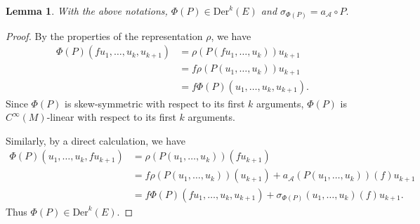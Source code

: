 \documentclass[pdftex]{sigma}%
\numberwithin{equation}{section}
\newtheorem{lem}[thm]{Lemma}
\newcommand{\huaA}{\mathcal{A}}
\newcommand{\CWM}{C^{\infty}(M)}
\newcommand{\Der}{\mathrm{Der}}
\begin{document}
\begin{lem}%
With the above notations, $\Phi(P)\in \Der^{k}(E)$ and $\sigma_{\Phi(P)}=a_\huaA\circ P.$
\end{lem}
\begin{proof}
By the properties of the representation $\rho$, we have
\begin{align*}
\Phi(P)(fu_1,\dots,u_k,u_{k+1})&=\rho(P(fu_1,\dots,u_k))u_{k+1}
\\
&=f\rho(P(u_1,\dots,u_k))u_{k+1}
\\
&=f\Phi(P)(u_1,\dots,u_k,u_{k+1}).
\end{align*}
Since $\Phi(P)$ is skew-symmetric with respect to its first $k$ arguments, $\Phi(P)$ is $\CWM$-linear with respect to its first $k$ arguments.

Similarly, by a direct calculation, we have
\begin{align*}
\Phi(P)(u_1,\dots,u_k,fu_{k+1})&=\rho(P(u_1,\dots,u_k))(fu_{k+1})
\\
&=f\rho(P(u_1,\dots,u_k))(u_{k+1})+a_{\huaA}(P(u_1,\dots,u_k))(f)u_{k+1}
\\
&=f\Phi(P)(fu_1,\dots,u_k,u_{k+1})+\sigma_{\Phi(P)}(u_1,\dots,u_k)(f)u_{k+1}.
\end{align*}
Thus $\Phi(P)\in\Der^{k}(E)$.
\end{proof}
\end{document}
